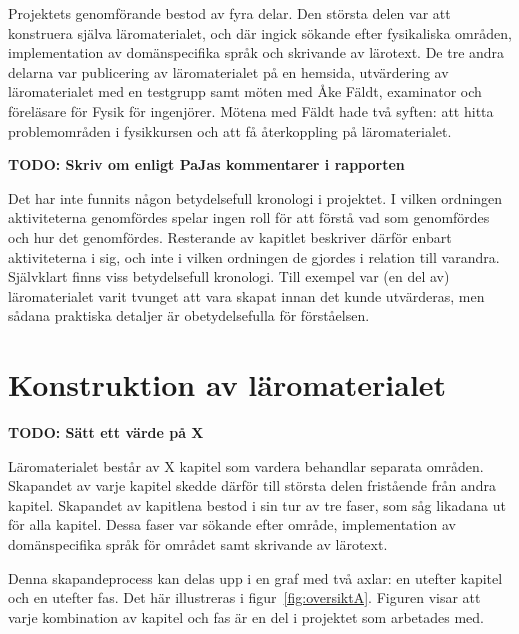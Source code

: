 \begin{draft}

Projektets genomförande bestod av fyra delar. Den största delen var att
konstruera själva läromaterialet, och där ingick sökande efter fysikaliska
områden, implementation av domänspecifika språk och skrivande av lärotext. De
tre andra delarna var publicering av läromaterialet på en hemsida, utvärdering
av läromaterialet med en testgrupp samt möten med Åke Fäldt, examinator och
föreläsare för Fysik för ingenjörer. Mötena med Fäldt hade två syften: att hitta
problemområden i fysikkursen och att få återkoppling på läromaterialet.

\begin{binge}
\textbf{TODO: Skriv om enligt PaJas kommentarer i rapporten}

Det har inte funnits någon betydelsefull kronologi i projektet. I vilken
ordningen aktiviteterna genomfördes spelar ingen roll för att förstå vad som
genomfördes och hur det genomfördes. Resterande av kapitlet beskriver därför
enbart aktiviteterna i sig, och inte i vilken ordningen de gjordes i relation
till varandra. Självklart finns viss betydelsefull kronologi. Till exempel var
(en del av) läromaterialet varit tvunget att vara skapat innan det kunde
utvärderas, men sådana praktiska detaljer är obetydelsefulla för förståelsen.
\end{binge}

\section{Konstruktion av läromaterialet}\label{sec:konstruktion}

\textbf{TODO: Sätt ett värde på X}

Läromaterialet består av X kapitel som vardera behandlar separata
områden. Skapandet av varje kapitel skedde därför till största delen fristående
från andra kapitel. Skapandet av kapitlena bestod i sin tur av tre faser,
som såg likadana ut för alla kapitel. Dessa faser var sökande efter område,
implementation av domänspecifika språk för området samt skrivande av lärotext.

Denna skapandeprocess kan delas upp i en graf med två axlar: en utefter kapitel
och en utefter fas. Det här illustreras i figur~\ref{fig:oversiktA}. Figuren
visar att varje kombination av kapitel och fas är en del i projektet som
arbetades med.


\end{draft}
